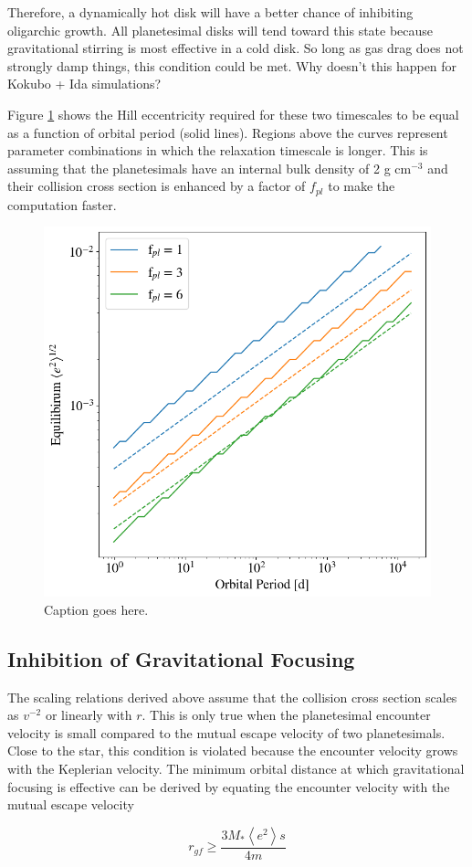 \documentclass[onecolumn]{aastex63}
\begin{document}
Therefore, a dynamically hot disk will have a better chance of inhibiting oligarchic growth. All planetesimal disks will tend toward this state because gravitational stirring is most effective in a cold disk. So long as gas drag does not strongly damp things, this condition could be met. Why doesn't this happen for Kokubo + Ida simulations?

Figure \ref{fig:time_eq_gf} shows the Hill eccentricity required for these two timescales to be equal as a function of orbital period (solid lines). Regions above the curves represent parameter combinations in which the relaxation timescale is longer. This is assuming that the planetesimals have an internal bulk density of 2 g cm$^{-3}$ and their collision cross section is enhanced by a factor of $f_{pl}$ to make the computation faster.

\begin{figure}
    \begin{center}
    \includegraphics[width=0.4\columnwidth]{figures/time_eq_gf.png}
    \caption{Caption goes here.\label{fig:time_eq_gf}}
    \end{center}
\end{figure}

\subsection{Inhibition of Gravitational Focusing}

The scaling relations derived above assume that the collision cross section scales as $v^{-2}$ or linearly with $r$. This is only true when the planetesimal encounter velocity is small compared to the mutual escape velocity of two planetesimals. Close to the star, this condition is violated because the encounter velocity grows with the Keplerian velocity. The minimum orbital distance at which gravitational focusing is effective can be derived by equating the encounter velocity with the mutual escape velocity

\begin{equation}
    r_{gf} \geq \frac{3 M_{*} \left< e^{2} \right> s}{4 m}
\end{equation}
\end{document}

